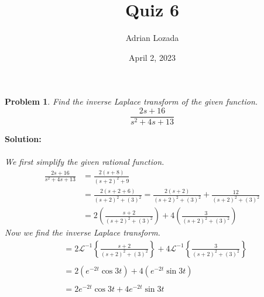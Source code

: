 \documentclass{article}
\title{Quiz 6}
\author{Adrian Lozada}
\date{April 2, 2023}
\newtheorem{problem}{Problem}
\begin{document}
    \maketitle
    \newpage

    \begin{problem}
        Find the inverse Laplace transform of the given function.
        \[
            \frac{2s + 16}{s^{2} + 4s + 13}
        \]
    \end{problem}
    \textbf{Solution:} \\ \\ 
    \textit{We first simplify the given rational function.} \\
     \begin{align*}
        \frac{2s + 16}{s^{2} + 4s + 13} &= \frac{2(s + 8)}{(s + 2)^{2} + 9} \\
        &= \frac{2(s + 2 + 6)}{(s + 2)^{2} + (3)^{2}} = \frac{2(s + 2)}{(s + 2)^{2} + (3)^{2}} + \frac{12}{(s + 2)^{2} + (3)^{2}} \\
        &= 2\left( \frac{s + 2}{(s + 2)^{2} + (3)^{2}}\right) + 4\left( \frac{3}{(s + 2)^{2} + (3)^{2}}\right)
     \end{align*}
    \textit{Now we find the inverse Laplace transform.} \\
    \begin{align*}
       &= 2\mathcal{L}^{-1} \left\{ \frac{s + 2}{(s + 2)^{2} + (3)^{2}}\right\} + 4\mathcal{L}^{-1} \left\{ \frac{3}{(s + 2)^{2} + (3)^{2}}\right\} \\ \\
       &= 2(e^{-2t}\cos{3t}) + 4(e^{-2t}\sin{3t}) \\ \\
       &= 2e^{-2t}\cos{3t} + 4e^{-2t}\sin{3t}
    \end{align*}
    \newpage
\end{document}
